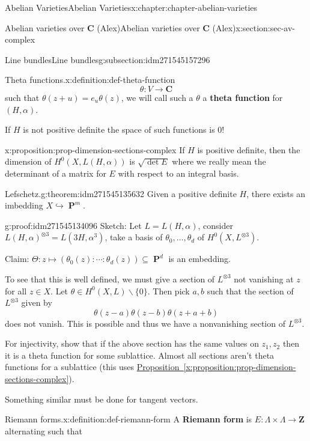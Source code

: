 \documentclass[oneside,10pt,]{book}
\newcommand{\terminology}[1]{\textbf{#1}}
\numberwithin{equation}{section}
\newcommand{\ZZ}{\mathbf{Z}}
\newcommand{\CC}{\mathbf{C}}
\DeclareMathOperator{\PP}{\mathbf{P}}
\begin{document}
\begin{chapterptx}{Abelian Varieties}{}{Abelian Varieties}{}{}{x:chapter:chapter-abelian-varieties}
\begin{sectionptx}{Abelian varieties over \(\CC\) (Alex)}{}{Abelian varieties over \(\CC\) (Alex)}{}{}{x:section:sec-av-complex}
\begin{subsectionptx}{Line bundles}{}{Line bundles}{}{}{g:subsection:idm271545157296}
\begin{definition}{Theta functions.}{x:definition:def-theta-function}
\begin{equation*}
\theta \colon V \to \CC
\end{equation*}
such that \(\theta(z+ u) = e_u \theta(z)\), we will call such a \(\theta\) a \terminology{theta function} for \((H,\alpha)\).%
\end{definition}
If \(H\) is not positive definite the space of such functions is 0!%
\begin{proposition}{}{}{x:proposition:prop-dimension-sections-complex}%
If \(H\) is positive definite, then the dimension of \(H^0(X, L(H,\alpha))\) is \(\sqrt{\det E}\) where we really mean the determinant of a matrix for \(E\) with respect to an integral basis.%
\end{proposition}
\begin{theorem}{Lefschetz.}{}{g:theorem:idm271545135632}%
Given a positive definite \(H\), there exists an imbedding \(X \hookrightarrow \PP^m\).%
\end{theorem}
\begin{proofptx}{}{g:proof:idm271545134096}
Sketch: Let \(L = L(H,\alpha)\), consider \(L(H,\alpha)^{\otimes 3} = L(3H, \alpha^3)\), take a basis of \(\theta_0,\ldots, \theta_d\) of \(H^0(X, L^{\otimes 3})\).%
\par
Claim: \(\Theta\colon z\mapsto (\theta_0(z) :\cdots :\theta_d (z)) \subseteq \PP^d\) is an embedding.%
\par
To see that this is well defined, we must give a section of \(L^{\otimes 3}\) not vanishing at \(z\) for all \(z\in X\). Let \(\theta \in H^0(X,L)\smallsetminus \{0\}\). Then pick \(a,b\) such that the section of \(L^{\otimes 3}\) given by%
\begin{equation*}
\theta(z-a)\theta(z-b) \theta(z+ a+b)
\end{equation*}
does not vanish. This is possible and thus we have a nonvanishing section of \(L^{\otimes 3}\).%
\par
For injectivity, show that if the above section has the same values on \(z_1,z_2\) then it is a theta function for some sublattice. Almost all sections aren't theta functions for a sublattice (this uses \hyperref[x:proposition:prop-dimension-sections-complex]{Proposition~\ref{x:proposition:prop-dimension-sections-complex}}).%
\par
Something similar must be done for tangent vectors.%
\end{proofptx}
\begin{definition}{Riemann forms.}{x:definition:def-riemann-form}%
A \terminology{Riemann form} is \(E\colon \Lambda \times \Lambda \to \ZZ\) alternating such that%

\end{definition}
\end{subsectionptx}
\end{sectionptx}
\end{chapterptx}
\end{document}
